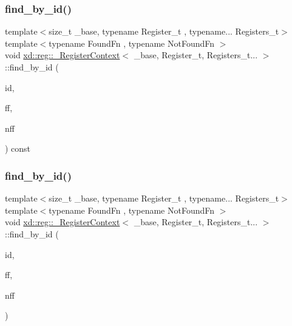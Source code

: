 \subsubsection{\texorpdfstring{find\+\_\+by\+\_\+id()}{find\_by\_id()}\hspace{0.1cm}{\footnotesize\ttfamily [1/2]}}
{\footnotesize\ttfamily template$<$size\+\_\+t \+\_\+base, typename Register\+\_\+t , typename... Registers\+\_\+t$>$ \\
template$<$typename Found\+Fn , typename Not\+Found\+Fn $>$ \\
void \mbox{\hyperlink{classxd_1_1reg_1_1___register_context}{xd\+::reg\+::\+\_\+\+Register\+Context}}$<$ \+\_\+base, Register\+\_\+t, Registers\+\_\+t... $>$\+::find\+\_\+by\+\_\+id (\begin{DoxyParamCaption}\item[{size\+\_\+t}]{id,  }\item[{Found\+Fn}]{ff,  }\item[{Not\+Found\+Fn}]{nff }\end{DoxyParamCaption}) const\hspace{0.3cm}{\ttfamily [inline]}}

\mbox{\label{classxd_1_1reg_1_1___register_context_3_01__base_00_01_register__t_00_01_registers__t_8_8_8_01_4_aa4be413d1af88965261cfd36820f477b}} 
\subsubsection{\texorpdfstring{find\+\_\+by\+\_\+id()}{find\_by\_id()}\hspace{0.1cm}{\footnotesize\ttfamily [2/2]}}
{\footnotesize\ttfamily template$<$size\+\_\+t \+\_\+base, typename Register\+\_\+t , typename... Registers\+\_\+t$>$ \\
template$<$typename Found\+Fn , typename Not\+Found\+Fn $>$ \\
void \mbox{\hyperlink{classxd_1_1reg_1_1___register_context}{xd\+::reg\+::\+\_\+\+Register\+Context}}$<$ \+\_\+base, Register\+\_\+t, Registers\+\_\+t... $>$\+::find\+\_\+by\+\_\+id (\begin{DoxyParamCaption}\item[{size\+\_\+t}]{id,  }\item[{Found\+Fn}]{ff,  }\item[{Not\+Found\+Fn}]{nff }\end{DoxyParamCaption})\hspace{0.3cm}{\ttfamily [inline]}}


